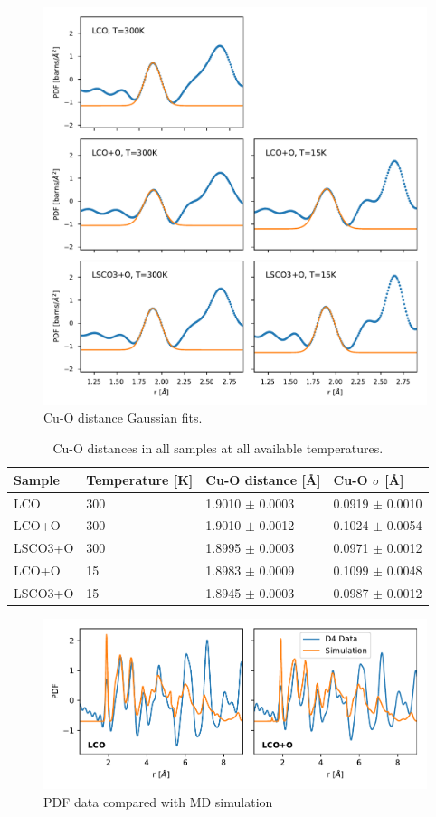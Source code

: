 \begin{figure}[H]
    \centering
    \includegraphics[width=\textwidth]{fig/pdf/cu_o_fits.pdf}
    \caption{Cu-O distance Gaussian fits.}
    \label{fig:cu_o_fits}
\end{figure}

\begin{table}[H]
    \centering
    \begin{tabular}{llll}
        \toprule
          Sample & Temperature [K] &        Cu-O distance [\AA] &           Cu-O $\sigma$ [\AA] \\
        \midrule
             LCO &         300 &  1.9010 $\pm$ 0.0003 &  0.0919 $\pm$ 0.0010 \\
           LCO+O &         300 &  1.9010 $\pm$ 0.0012 &  0.1024 $\pm$ 0.0054 \\
         LSCO3+O &         300 &  1.8995 $\pm$ 0.0003 &  0.0971 $\pm$ 0.0012 \\
           LCO+O &          15 &  1.8983 $\pm$ 0.0009 &  0.1099 $\pm$ 0.0048 \\
         LSCO3+O &          15 &  1.8945 $\pm$ 0.0003 &  0.0987 $\pm$ 0.0012 \\
        \bottomrule
    \end{tabular}    
    \caption{Cu-O distances in all samples at all available temperatures.}
    \label{tab:cu_o_fits}
\end{table}

\begin{figure}[]
    \centering
    \includegraphics[width=\textwidth]{fig/pdf/pdf_simulation_experiment_compare.pdf}
    \caption[PDF data compared with MD simulation]{PDF data compared with MD simulation}
    \label{fig:pdf_sim_comparision}
\end{figure}